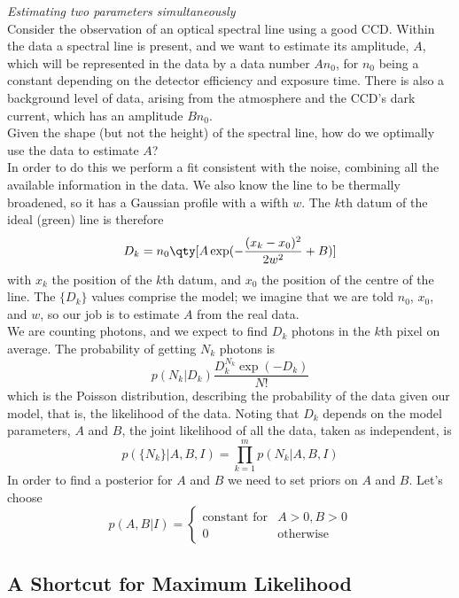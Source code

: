 \documentclass{dwnotes}         		        %
\begin{document}
\begin{example}{\em Estimating two parameters simultaneously}\\
   Consider the observation of an optical spectral line using a good
   CCD. Within the data a spectral line is present, and we want to
   estimate its amplitude, $A$, which will be represented in the data
   by a data number $A n_0$, for $n_0$ being a constant depending on
   the detector efficiency and exposure time. There is also a
   background level of data, arising from the atmosphere and the CCD's
   dark current, which has an amplitude $B n_0$.\\
   Given the shape (but not the height) of the spectral line, how do we
   optimally use the data to estimate $A$?\\
   In order to do this we perform a fit consistent with the noise,
   combining all the available information in the data. We also know
   the line to be thermally broadened, so it has a Gaussian profile
   with a wifth $w$. The $k$th datum of the ideal (green) line is therefore
   \[ D_k = n_0 \qty[ A \exp(- \frac{(x_k -x_0)^2}{2w^2} + B ) ] \] with
   $x_k$ the position of the $k$th datum, and $x_0$ the position of the
   centre of the line. The $\{ D_k \}$ values comprise the model; we
   imagine that we are told $n_0$, $x_0$, and $w$, so our job is to
   estimate $A$ from the real data.\\ 
   We are counting photons, and we expect to find $D_k$ photons in the
   $k$th pixel on average. The probability of getting $N_k$ photons is
   \[ p(N_k | D_k) \frac{D_k^{N_k} \exp(-D_k)}{N!} \] which is the
   Poisson distribution, describing the probability of the data given
   our model, that is, the likelihood of the data. Noting that $D_k$
   depends on the model parameters, $A$ and $B$, the joint likelihood
   of all the data, taken as independent, is
   \[ p( \{ N_k \} | A, B, I) = \prod_{k=1}^m p(N_k | A,B,I) \] In
   order to find a posterior for $A$ and $B$ we need to set priors on
   $A$ and $B$. Let's choose 
   \[ p(A,B|I) =
   \begin{cases}
     \text{constant for} & A>0, B>0\\
     0 & \text{otherwise}
   \end{cases}
   \]
\end{example}

\subsection{A Shortcut for Maximum Likelihood}
\label{sec:shortc-maxim-likel}
\end{document}
